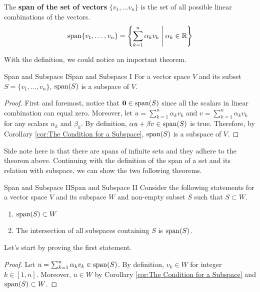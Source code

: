 \documentclass[../main.tex]{subfiles}
\begin{document}
\begin{definition}
The \textbf{span of the set of vectors} $\{ v_1, \ldots v_n \}$ is
the set of all possible linear combinations of the vectors.
\[
\operatorname{span}\{v_1, \ldots, v_n\}
= \left\{
    \sum_{k = 1}^n \alpha_k v_k \; \middle|\; \alpha_k \in \mathbb{R}
\right\}
\]
\end{definition}

With the definition, we could notice an important theorem.

\begin{theorem}{Span and Subspace I}{Span and Subspace I}
For a vector space $V$ and its subset $S = \{ v_1, \ldots, v_n \}$,
$\operatorname{span}(S)$ is a subspace of $V$.
\end{theorem}
\begin{proof}
First and foremost, notice that $\mathbf{0} \in \operatorname{span}(S)$ since all
the scalars in linear combination can equal zero. Moreover, let $u =
\sum_{k = 1}^n \alpha_k v_k$ and $v = \sum_{k = 1}^n \alpha_k v_k$ for
any scalars $\alpha_k$ and $\beta_k$. By definition, $\alpha u +
\beta v \in \operatorname{span}(S)$ is true. Therefore, by Corollary
\ref{cor:The Condition for a Subspace}, $\operatorname{span}(S)$ is a subspace of
$V$.
\end{proof}

Side note here is that there are spans of infinite sets and they
adhere to the theorem above. Continuing with the definition of the
span of a set and its relation with subspace, we can show the two
following theorems.

\begin{theorem}{Span and Subspace II}{Span and Subspace II}
Consider the following statements for a vector space $V$ and its
subspace $W$ and non-empty subset $S$ such that $S \subset W$.
\begin{enumerate}[noitemsep]
\item $\operatorname{span}(S) \subset W$
\item The intersection of all subspaces containing $S$ is $\operatorname{span}(S)$.
\end{enumerate}
\end{theorem}

Let's start by proving the first statement.

\begin{proof}
Let $u = \sum_{k = 1}^n \alpha_k v_k \in \operatorname{span}(S)$. By definition,
$v_k \in W$ for integer $k \in [1, n]$. Moreover, $u \in W$ by
Corollary \ref{cor:The Condition for a Subspace} and $\operatorname{span}(S)
\subset W$.
\end{proof}
\end{document}
